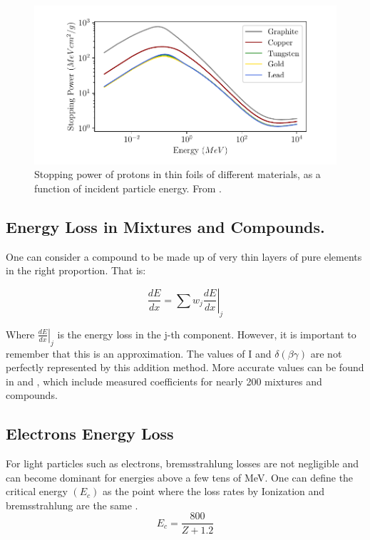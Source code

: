  \begin{figure}[h]
    \centering
    \includegraphics[width=1.0\columnwidth]{EdepMetal/EneDepMetal.pdf}
    \caption{Stopping power of protons in thin foils of different materials, as a function of incident particle energy. From \parencite*[][]{ref:NIST}.}
    \label{fig:EneDep}
\end{figure}

\subsection{Energy Loss in Mixtures and Compounds.}

One can consider a compound to be made up of very thin layers of pure elements in the right proportion. That is: 

 \begin{equation}
    \frac{dE}{dx} =  \sum w_j \left.\frac{dE}{dx} \right\vert_j
 \end{equation}

Where $\left. \frac{dE}{dx}\right\vert_j$  is the energy loss in the j-th component. However, it is important to remember that this is an approximation. The values of I and $\delta (\beta\gamma)$ are not perfectly represented by this addition method. More accurate values can be found in \parencite*[][]{ref:compound1} and \parencite*[][]{ref:compound2}, which include measured coefficients for nearly 200 mixtures and compounds. 

\subsection{Electrons Energy Loss}

For light particles such as electrons, bremsstrahlung losses are not negligible and can become dominant for energies above a few tens of \si[]{\mega\electronvolt}. One can define the critical energy $(E_c)$ as the point where the loss rates by Ionization and bremsstrahlung are the same \parencite*[][]{ref:EleCricEne}. 
\begin{equation}
    E_c = \frac{800}{Z + 1.2}
    \label{eq:ec}
\end{equation}

